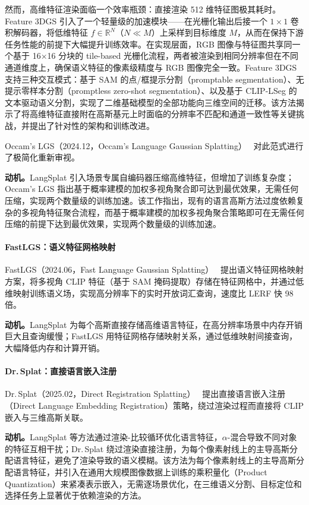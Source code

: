 然而，高维特征渲染面临一个效率瓶颈：直接渲染 512 维特征图极其耗时。Feature 3DGS 引入了一个轻量级的加速模块——在光栅化输出后接一个 $1 \times 1$ 卷积解码器，将低维特征 $f \in \mathbb{R}^N$（$N \ll M$）上采样到目标维度 $M$，从而在保持下游任务性能的前提下大幅提升训练效率。在实现层面，RGB 图像与特征图共享同一个基于 16$\times$16 分块的 tile-based 光栅化流程，两者被渲染到相同分辨率但在不同通道维度上，确保语义特征的像素级精度与 RGB 图像完全一致。Feature 3DGS 支持三种交互模式：基于 SAM 的点/框提示分割（promptable segmentation）、无提示零样本分割（promptless zero-shot segmentation）、以及基于 CLIP-LSeg 的文本驱动语义分割，实现了二维基础模型的全部功能向三维空间的迁移。该方法揭示了将高维特征直接附在高斯基元上时面临的分辨率不匹配和通道一致性等关键挑战，并提出了针对性的架构和训练改进。

Occam's LGS（2024.12，Occam's Language Gaussian Splatting）~\cite{2412_01807} 对此范式进行了极简化重新审视。

\textbf{动机。}LangSplat 引入场景专属自编码器压缩高维特征，但增加了训练复杂度；Occam's LGS 指出基于概率建模的加权多视角聚合即可达到最优效果，无需任何压缩，实现两个数量级的训练加速。该工作指出，现有的语言高斯方法过度依赖复杂的多视角特征聚合流程，而基于概率建模的加权多视角聚合策略即可在无需任何压缩的前提下达到最优效果，实现两个数量级的训练加速。

\paragraph{FastLGS：语义特征网格映射} FastLGS（2024.06，Fast Language Gaussian Splatting）~\cite{2406_01916} 提出语义特征网格映射方案，将多视角 CLIP 特征（基于 SAM 掩码提取）存储在特征网格中，并通过低维映射训练语义场，实现高分辨率下的实时开放词汇查询，速度比 LERF 快 98 倍。

\textbf{动机。}LangSplat 为每个高斯直接存储高维语言特征，在高分辨率场景中内存开销巨大且查询缓慢；FastLGS 用特征网格存储映射关系，通过低维映射间接查询，大幅降低内存和计算开销。

\paragraph{Dr.\,Splat：直接语言嵌入注册} Dr.\,Splat（2025.02，Direct Registration Splatting）~\cite{2502_16652} 提出直接语言嵌入注册（Direct Language Embedding Registration）策略，绕过渲染过程而直接将 CLIP 嵌入与三维高斯关联。

\textbf{动机。}LangSplat 等方法通过渲染-比较循环优化语言特征，$\alpha$-混合导致不同对象的特征互相干扰；Dr.\,Splat 绕过渲染直接注册，为每个像素射线上的主导高斯分配语言特征，避免了渲染导致的语义模糊。该方法为每个像素射线上的主导高斯分配语言特征，并引入在通用大规模图像数据上训练的乘积量化（Product Quantization）来紧凑表示嵌入，无需逐场景优化，在三维语义分割、目标定位和选择任务上显著优于依赖渲染的方法。

